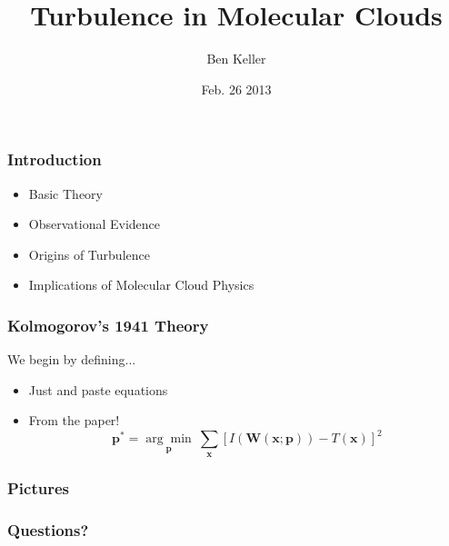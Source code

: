 \documentclass[serif,mathserif]{beamer}
\author{Ben Keller}
\title[Short
Title\hspace{2em}\insertframenumber/\inserttotalframenumber]{Turbulence in
Molecular Clouds}
\date{Feb. 26 2013} %
\institute{Physics 785}
\begin{document}
\maketitle


\begin{frame}
  \frametitle{Introduction}
  \begin{itemize}
  \item Basic Theory\pause
  \item Observational Evidence\pause
  \item Origins of Turbulence\pause
  \item Implications of Molecular Cloud Physics
  \end{itemize}
\end{frame}


\begin{frame}
  \frametitle{Kolmogorov's 1941 Theory}
  We begin by defining...
  \begin{itemize}
  \item Just and paste equations\pause
  \item From the paper!
    \begin{equation*}
      \textbf{p}^* = \underset{\textbf{p}}{\arg\!\min}~\sum_{\textbf{x}}\left[ I(\textbf{W}(\textbf{x};\textbf{p})) - T(\textbf{x}) \right]^2
    \end{equation*}
  \end{itemize}
\end{frame}

\begin{frame}
  \frametitle{Pictures}
  \begin{figure}[t]
    \centering
  \end{figure}
\end{frame}



\begin{frame}
  \frametitle{Questions?}
\end{frame}
\end{document}
